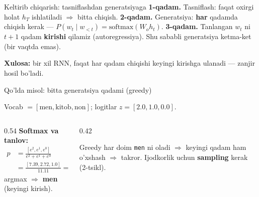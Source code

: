 \documentclass[aspectratio=169,11pt]{beamer}
\begin{document}
\begin{frame}{Keltirib chiqarish: tasniflashdan generatsiyaga}
  \textbf{1-qadam.} Tasniflash: faqat oxirgi holat $h_T$ ishlatiladi
  $\Rightarrow$ bitta chiqish.
  \pause
  \textbf{2-qadam.} Generatsiya: \textbf{har} qadamda chiqish kerak ---
  $P(w_t\mid w_{<t})=\mathrm{softmax}(W_o h_t)$.
  \pause
  \textbf{3-qadam.} Tanlangan $w_t$ ni $t{+}1$ qadam \textbf{kirishi} qilamiz
  (autoregressiya). Shu sababli generatsiya ketma-ket (bir vaqtda emas).
  \begin{tcolorbox}[okbox,top=2pt,bottom=2pt]
    \small \textbf{Xulosa:} bir xil RNN, faqat har qadam chiqishi keyingi kirishga
    ulanadi --- zanjir hosil bo'ladi.
  \end{tcolorbox}
\end{frame}

\begin{frame}{Qo'lda misol: bitta generatsiya qadami (greedy)}
  \begin{tcolorbox}[defbox,title={Logitlar va lug'at}]
    \small Vocab $=[\text{men}, \text{kitob}, \text{non}]$; logitlar $z=[2.0, 1.0, 0.0]$.
  \end{tcolorbox}
  \vspace{0.2em}
  \begin{columns}[T]
    \begin{column}{0.54\textwidth}
      \textbf{Softmax va tanlov:}
      \begin{align*}
        p &= \tfrac{[e^2, e^1, e^0]}{e^2+e^1+e^0}\\
          &= \tfrac{[7.39, 2.72, 1.0]}{11.11} = [0.665, 0.245, 0.090]
      \end{align*}
      argmax $\Rightarrow$ \textbf{men} (keyingi kirish).
    \end{column}
    \begin{column}{0.42\textwidth}
      \begin{tcolorbox}[okbox,top=2pt,bottom=2pt]
        \footnotesize
        Greedy har doim \texttt{men} ni oladi $\Rightarrow$ keyingi qadam ham
        o'xshash $\Rightarrow$ takror. Ijodkorlik uchun \textbf{sampling} kerak
        (2-tsikl).
      \end{tcolorbox}
    \end{column}
  \end{columns}
\end{frame}
\end{document}
